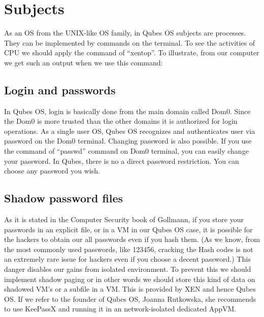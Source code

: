 \documentclass[runningheads,a4paper]{article}
\begin{document}
\section{Subjects}

As an OS from the UNIX-like OS family, in Qubes OS
subjects are processes. They can be implemented by commands on the
terminal. To see the activities of CPU we should apply the command of
“xentop”. To illustrate, from our computer we get such an output when
we use this command:

\subsection{Login and passwords} 

In Qubes OS, login is basically done
from the main domain called Dom0.  Since the Dom0 is more trusted than
the other domains it is authorized for login operations.  As a single
user OS, Qubes OS recognizes and authenticates user via password on
the Dom0 terminal.  Changing password is also possible.  If you use
the command of “passwd” command on Dom0 terminal, you can easily
change your password.  In Qubes, there is no a direct password
restriction.  You can choose any password you wish.

\subsection{Shadow password files} 

As it is stated in the Computer
Security book of Gollmann, if you store your passwords in an explicit
file, or in a VM in our Qubes OS case, it is possible for the hackers
to obtain our all passwords even if you hash them.  (As we know, from
the most commonly used passwords, like 123456, cracking the Hash codes
is not an extremely rare issue for hackers even if you choose a decent
password.)  This danger disables our gains from isolated environment.
To prevent this we should implement shadow paging or in other words we
should store this kind of data on shadowed VM’s or a subfile in a VM.
This is provided by XEN and hence Qubes OS.  If we refer to the
founder of Qubes OS, Joanna Rutkowska, she recommends to use KeePassX
and running it in an network-isolated dedicated AppVM.
\end{document}
